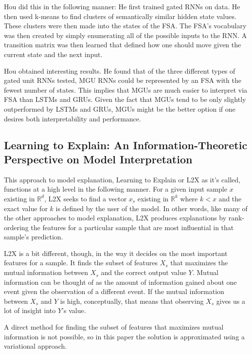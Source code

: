 \documentclass[12pt, letterpaper]{article}
\begin{document}
Hou did this in the following manner: He first trained gated RNNs on data. He then used k-means to find clusters of semantically similar hidden state values. These clusters were then made into the states of the FSA. The FSA's vocabulary was then created by simply enumerating all of the possible inputs to the RNN. A transition matrix was then learned that defined how one should move given the current state and the next input. 

Hou obtained interesting results. He found that of the three different types of gated unit RNNs tested, MGU RNNs could be represented by an FSA with the fewest number of states. This implies  that MGUs are much easier to interpret via FSA than LSTMs and GRUs. Given the fact that MGUs tend to be only slightly outperformed by LSTMs and GRUs, MGUs might be the better option if one desires both interpretability and performance.
\subsection{Learning to Explain: An Information-Theoretic Perspective
on Model Interpretation}
This approach to model explanation, Learning to Explain or L2X as it's called, functions at a high level in the following manner. For a given input sample $x$ existing in $\mathbb{R}^{d}$, L2X seeks to find a vector $x_{s}$ existing in $\mathbb{R}^{k}$ where $k<x$ and the exact value for $k$ is defined by the user of the model. In other words, like many of the other approaches to model explanation, L2X produces explanations by rank-ordering the features for a particular sample that are most influential in that sample's prediction.

L2X is a bit different, though, in the way it decides on the most important features for a sample. It finds the subset of features $X_{s}$ that maximizes the mutual information between $X_{s}$ and the correct output value $Y$. Mutual information can be thought of as the amount of information gained about one event given the observation of a different event. If the mutual information between $X_{s}$ and $Y$ is high, conceptually, that means that observing $X_{s}$ gives us a lot of insight into $Y$'s value.

A direct method for finding the subset of features that maximizes mutual information is not possible, so in this paper the solution is approximated using a variational approach.
\end{document}
